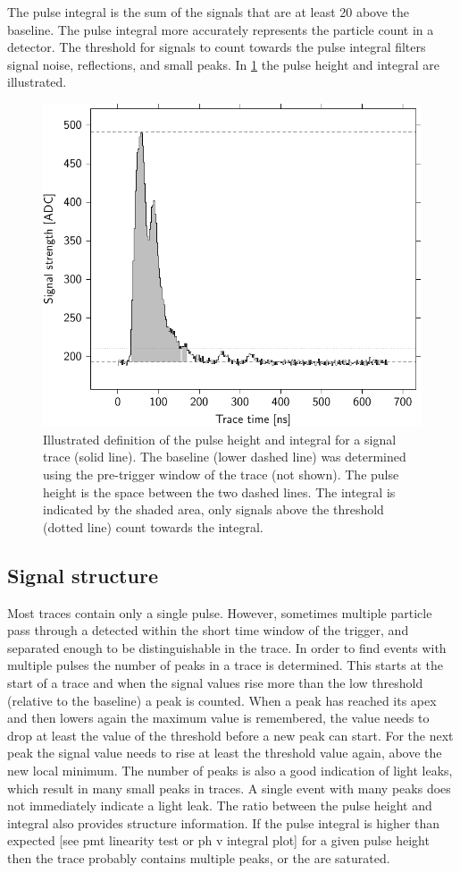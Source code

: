 The pulse integral is the sum of the signals that are at least \SI{20}{\adc} above the baseline. The pulse integral more accurately represents the particle count in a detector. The threshold for signals to count towards the pulse integral filters signal noise, reflections, and small peaks. In \cref{fig:integral} the pulse height and integral are illustrated.

\begin{figure}
    \centering
    \includegraphics[width=0.7\linewidth]{plots/processing/integral}
    \caption{Illustrated definition of the pulse height and integral for a signal trace (solid line). The baseline (lower dashed line) was determined using the pre-trigger window of the trace (not shown). The pulse height is the space between the two dashed lines. The integral is indicated by the shaded area, only signals above the threshold (dotted line) count towards the integral.}
    \label{fig:integral}
\end{figure}


\subsection{Signal structure}

Most traces contain only a single pulse. However, sometimes multiple particle pass through a detected within the short time window of the trigger, and separated enough to be distinguishable in the trace. In order to find events with multiple pulses the number of peaks in a trace is determined. This starts at the start of a trace and when the signal values rise more than the low threshold (relative to the baseline) a peak is counted. When a peak has reached its apex and then lowers again the maximum value is remembered, the value needs to drop at least the value of the threshold before a new peak can start. For the next peak the signal value needs to rise at least the threshold value again, above the new local minimum. The number of peaks is also a good indication of light leaks, which result in many small peaks in traces. A single event with many peaks does not immediately indicate a light leak. The ratio between the pulse height and integral also provides structure information. If the pulse integral is higher than expected [see pmt linearity test or ph v integral plot] for a given pulse height then the trace probably contains multiple peaks, or the \adcs are saturated.

